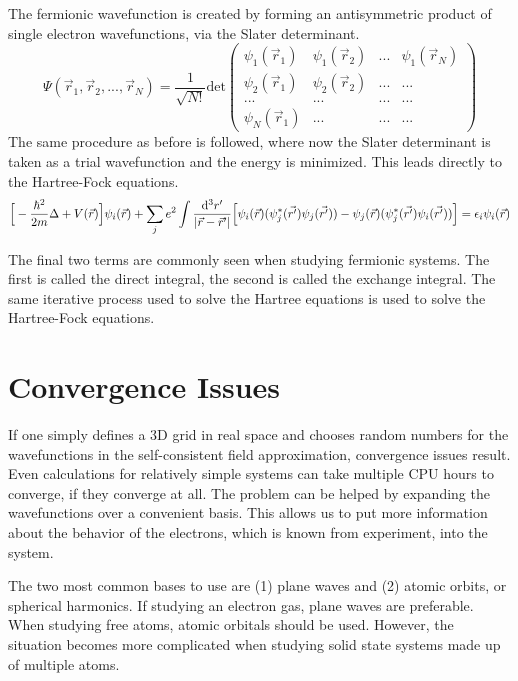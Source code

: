 \documentclass[notitlepage,letter,preprint,prb]{revtex4}
\begin{document}
	The fermionic wavefunction is created by forming an antisymmetric product of single electron wavefunctions, via the Slater determinant.
	\begin{equation}
	\Psi(\vec{r}_1,\vec{r}_2,...,\vec{r}_N) = \frac{1}{\sqrt{N!}}\mathrm{det}
	\left( \begin{array}{cccc}
	\psi_1(\vec{r}_1) & \psi_1(\vec{r}_2) & ... & \psi_1(\vec{r}_N) \\
	\psi_2(\vec{r}_1) & \psi_2(\vec{r}_2) & ... & ... \\
	... & ... & ... & ... \\
	\psi_N(\vec{r}_1) & ... & ... & ... \end{array} \right)
	\nonumber
	\end{equation}  
	The same procedure as before is followed, where now the Slater determinant is taken as a trial wavefunction and the energy is minimized.  This leads directly to the Hartree-Fock equations. 
	\begin{equation}
	\Big{[}-\frac{\hbar^2}{2m}\Delta + V(\vec{r})\Big{]}\psi_i(\vec{r}) + \sum_{j}e^{2}\int\frac{\mathrm{d}^{3}r'}{|\vec{r}-\vec{r}'|} \Big{[}\psi_i(\vec{r})(\psi^{*}_j(\vec{r'})\psi_j(\vec{r'})) - \psi_j(\vec{r})(\psi^{*}_j(\vec{r'})\psi_i(\vec{r'}))\Big{]} = \epsilon_i\psi_i(\vec{r})
	\nonumber
	\end{equation}
 
	The final two terms are commonly seen when studying fermionic systems.  The first is called the direct integral, the second is called the exchange integral\citealp{nanosolids}.  The same iterative process used to solve the Hartree equations is used to solve the Hartree-Fock equations.  
	
\section{Convergence Issues}
	If one simply defines a 3D grid in real space and chooses random numbers for the wavefunctions in the self-consistent field approximation, convergence issues result.  Even calculations for relatively simple systems can take multiple CPU hours to converge, if they converge at all\citealp{convergence}.  The problem can be helped by expanding the wavefunctions over a convenient basis.  This allows us to put more information about the behavior of the electrons, which is known from experiment, into the system.  
	
	The two most common bases to use are (1) plane waves and (2) atomic orbits, or spherical harmonics.  If studying an electron gas, plane waves are preferable.  When studying free atoms, atomic orbitals should be used.  However, the situation becomes more complicated when studying solid state systems made up of multiple atoms.  
	
\end{document}
